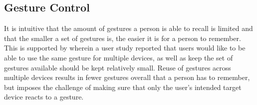 \subsection{Gesture Control}
\label{sec:introduction:gesture-control}

It is intuitive that the amount of gestures a person is able to recall is limited and that the smaller a set of gestures is, the easier it is for a person to remember. This is supported by \cite{Kela2006} wherein a user study reported that users would like to be able to use the same gesture for multiple devices, as well as keep the set of gestures available should be kept relatively small.
Reuse of gestures across multiple devices results in fewer gestures overall that a person has to remember, but imposes the challenge of making sure that only the user's intended target device reacts to a gesture.